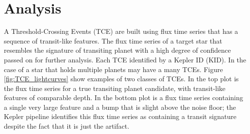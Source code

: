\chapter{Analysis}





	

A Threshold-Crossing Events (TCE) are built using flux time series that has a sequence of transit-like features. The flux time series of a target star that resembles the signature of transiting planet with a high degree of confidence passed on for further analysis. Each TCE identified by a Kepler ID (KID). In the case of a star that holds multiple planets may have a many TCEs. Figure \ref{fig:TCE_lightcurves} show examples of two classes of TCEs. In the top plot is the flux time series for a true transiting planet candidate, with transit-like features of comparable depth. In the bottom plot is a flux time series containing a single very large feature and a bump that is slight above the noise floor; the Kepler pipeline identifies this flux time series as containing a
transit signature despite the fact that it is just the artifact.
 


